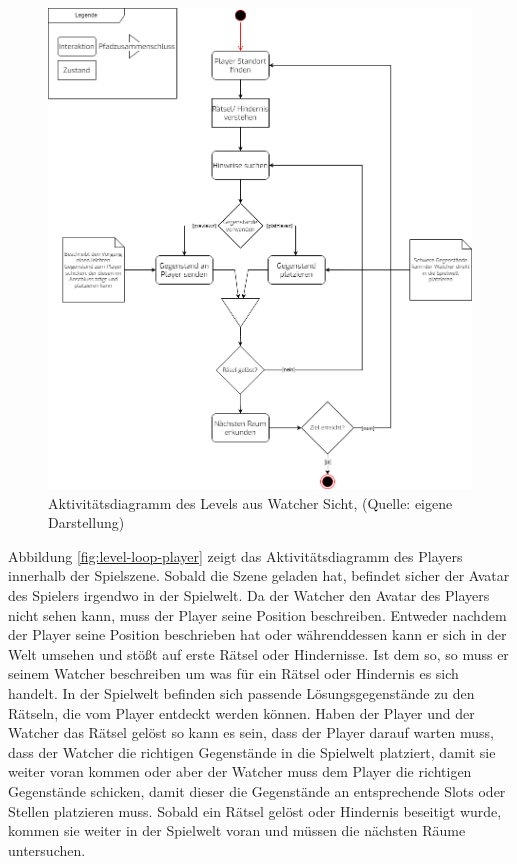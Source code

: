 \begin{figure}[ht]
\centering
\includegraphics[width=1\linewidth]{content/pictures/LevelLoop-Watcher.drawio.png}
\caption{Aktivitätsdiagramm des Levels aus Watcher Sicht, (Quelle: eigene Darstellung)}
\label{fig:level-loop-watcher}
\end{figure}

Abbildung \ref{fig:level-loop-player} zeigt das Aktivitätsdiagramm des Players innerhalb der Spielszene. Sobald die Szene geladen hat, befindet sicher der Avatar des Spielers irgendwo in der Spielwelt. Da der Watcher den Avatar des Players nicht sehen kann, muss der Player seine Position beschreiben. Entweder nachdem der Player seine Position beschrieben hat oder währenddessen kann er sich in der Welt umsehen und stößt auf erste Rätsel oder Hindernisse. Ist dem so, so muss er seinem Watcher beschreiben um was für ein Rätsel oder Hindernis es sich handelt. In der Spielwelt befinden sich passende Lösungsgegenstände zu den Rätseln, die vom Player entdeckt werden können. Haben der Player und der Watcher das Rätsel gelöst so kann es sein, dass der Player darauf warten muss, dass der Watcher die richtigen Gegenstände in die Spielwelt platziert, damit sie weiter voran kommen oder aber der Watcher muss dem Player die richtigen Gegenstände schicken, damit dieser die Gegenstände an entsprechende Slots oder Stellen platzieren muss. Sobald ein Rätsel gelöst oder Hindernis beseitigt wurde, kommen sie weiter in der Spielwelt voran und müssen die nächsten Räume untersuchen. 

